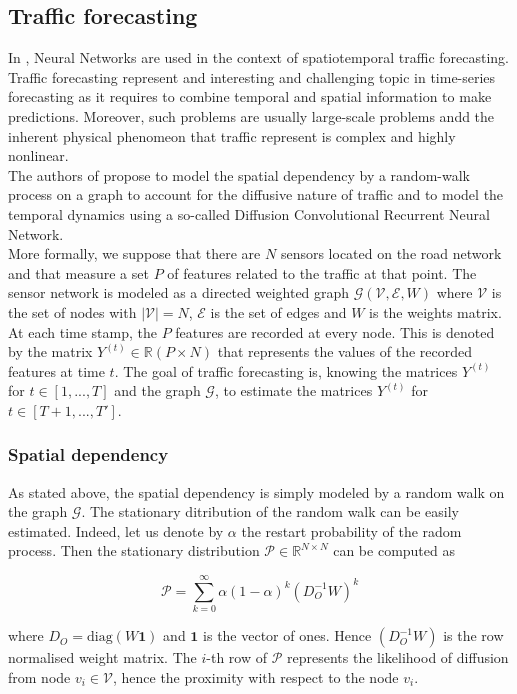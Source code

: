 \documentclass{article}
\begin{document}
\subsection*{Traffic forecasting}
In \cite{Traffic}, Neural Networks are used in the context of spatiotemporal traffic forecasting. Traffic forecasting represent and interesting and challenging topic in time-series forecasting as it requires to combine temporal and spatial information to make predictions. Moreover, such problems are usually large-scale problems andd the inherent physical phenomeon that traffic represent is complex and highly nonlinear. \\
The authors of \cite{Traffic} propose to model the spatial dependency by a random-walk process on a graph to account for the diffusive nature of traffic and to model the temporal dynamics using a so-called Diffusion Convolutional Recurrent Neural Network. \\
More formally, we suppose that there are $N$ sensors located on the road network and that measure a set $P$ of features related to the traffic at that point.
The sensor network is modeled as a directed weighted graph $\mathcal{G}(\mathcal{V}, \mathcal{E}, W)$ where $\mathcal{V}$ is the set of nodes with $|\mathcal{V}| = N$, $\mathcal{E}$ is the set of edges and $W$ is the weights matrix. At each time stamp, the $P$ features are recorded at every node. This is denoted by the matrix $Y^{(t)} \in \mathbb{R}(P \times N)$ that represents the values of the recorded features at time $t$.
The goal of traffic forecasting is, knowing the matrices $Y^{(t)}$ for $t \in [1,...,T]$ and the graph $\mathcal{G}$, to estimate the matrices $Y^{(t)}$ for $t \in [T+1, ..., T']$.

\subsubsection*{Spatial dependency}
As stated above, the spatial dependency is simply modeled by a random walk on the graph $\mathcal{G}$. The stationary ditribution of the random walk can be easily estimated. Indeed, let us denote by $\alpha$ the restart probability of the radom process. Then the stationary distribution $\mathcal{P} \in \mathbb{R}^{N \times N}$ can be computed as

$$\mathcal{P} = \sum_{k=0}^{\infty} \alpha (1-\alpha)^k (D_{O}^{-1}W)^k$$

where $D_{O} = \text{diag}(W\mathbf{1})$ and $\mathbf{1}$ is the vector of ones. Hence $(D_{O}^{-1}W)$ is the row normalised weight matrix. The $i$-th row of $\mathcal{P}$ represents the likelihood of diffusion from node $v_i \in \mathcal{V}$, hence the proximity with respect to the node $v_i$.
\end{document}
